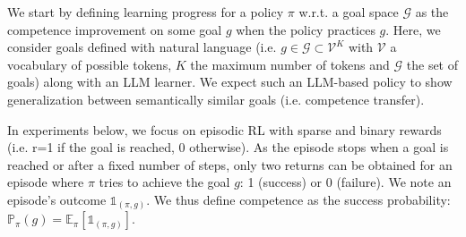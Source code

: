 



We start by defining learning progress for a policy $\pi$ w.r.t. a goal space $\mathcal{G}$ as the competence improvement on some goal $g$ when the policy practices $g$.
Here, we consider goals defined with natural language (i.e. $g \in \mathcal{G} \subset \mathcal{V}^K$ with $\mathcal{V}$ a vocabulary of possible tokens, $K$ the maximum number of tokens and $\mathcal{G}$ the set of goals) along with an LLM learner. We expect such an LLM-based policy to show generalization between semantically similar goals (i.e. competence transfer).

In experiments below, we focus on episodic RL with sparse and binary rewards (i.e. r=1 if the goal is reached, 0 otherwise). As the episode stops when a goal is reached or after a fixed number of steps, only two returns can be obtained for an episode where \( \pi \) tries to achieve the goal \( g \): 1 (success) or 0 (failure). We note an episode's outcome $\mathds{1}_{(\pi, g)}$. We thus define competence as the success probability: $\mathbb{P}_{\pi}(g) = \mathbb{E}_\pi\left[\mathds{1}_{(\pi, g)}\right]$. 



